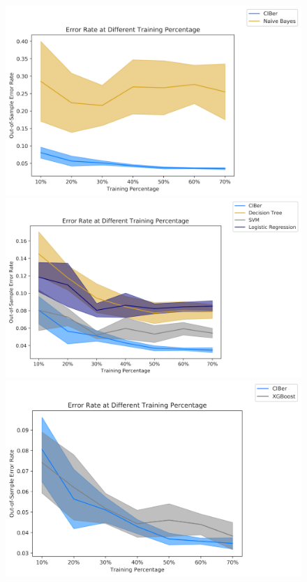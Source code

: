 \documentclass[twoside,11pt]{article}
\begin{document}
\begin{figure}[ht]
  \begin{minipage}[b]{0.5\linewidth}
    \centering
    \includegraphics[width=0.85\linewidth]{Figures/Empirical/err_change_oil_1.png}
  \end{minipage}
  \begin{minipage}[b]{0.5\linewidth}
    \centering
    \includegraphics[width=0.9\linewidth]{Figures/Empirical/err_change_oil_2.png}
  \end{minipage} 
  \begin{minipage}[b]{0.5\linewidth}
    \centering
    \includegraphics[width=0.85\linewidth]{Figures/Empirical/err_change_oil_xgb.png}

\end{minipage}
\end{figure}
\end{document}
